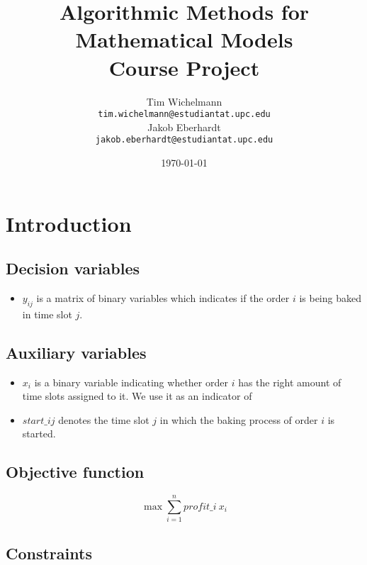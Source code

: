 \documentclass{article}
\title{Algorithmic Methods for Mathematical Models\\
  Course Project }
\author{Tim Wichelmann\\ \texttt{tim.wichelmann@estudiantat.upc.edu}\\[1ex] %
  Jakob Eberhardt\\ \texttt{jakob.eberhardt@estudiantat.upc.edu}}
\date{\today}
\begin{document}
\maketitle

\section{Introduction}

\subsection{Decision variables}
\begin{itemize}
    \item $y_{ij}$ is a matrix of binary variables which indicates if the order $i$ is being baked in time slot $j$.
\end{itemize}

\subsection{Auxiliary variables}

\begin{itemize}
\item $x_i$ is a binary variable indicating whether order $i$ has the right amount of time slots assigned to it. 
We use it as an indicator of 
\item $\mathit{start\_{ij}}$ denotes the time slot $j$ in which the baking process of order $i$ is started.
\end{itemize}

\subsection{Objective function}

\begin{equation*}
  \max \sum^n_{i = 1} \mathit{profit\_i} \: x_i
\end{equation*}

\subsection{Constraints}
\end{document}
